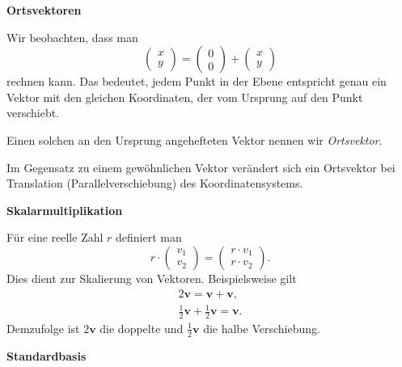 \documentclass[9pt]{beamer}
\newcommand{\bv}[1]{\mathbf{#1}}
\newcommand{\strong}[1]{\textsf{\textbf{#1}}}
\newcommand{\parspace}{\vspace{0.8em}}
\begin{document}
\begin{frame}
\begin{center}
\strong{Ortsvektoren}
\end{center}
\end{frame}

\begin{frame}
Wir beobachten, dass man
\[\begin{pmatrix}x\\ y\end{pmatrix}
= \begin{pmatrix}0\\ 0\end{pmatrix} + \begin{pmatrix}x\\ y\end{pmatrix}\]
rechnen kann. Das bedeutet, jedem Punkt in der Ebene entspricht genau
ein Vektor mit den gleichen Koordinaten, der vom Ursprung auf den Punkt
verschiebt.\pause

\parspace
Einen solchen an den Ursprung angehefteten Vektor nennen wir \emph{Ortsvektor}.\pause

\parspace
Im Gegensatz zu einem gewöhnlichen Vektor verändert sich ein Ortsvektor
bei Translation (Parallelverschiebung) des Koordinatensystems.
\end{frame}

\begin{frame}
\begin{center}
\strong{Skalarmultiplikation}
\end{center}
\end{frame}

\begin{frame}
Für eine reelle Zahl $r$ definiert man
\[r\cdot\begin{pmatrix}v_1\\ v_2\end{pmatrix}
= \begin{pmatrix}r\cdot v_1\\ r\cdot v_2\end{pmatrix}.\]\pause
Dies dient zur Skalierung von Vektoren. Beispielsweise gilt
\begin{gather*}
2\bv v = \bv v + \bv v,\\
\tfrac{1}{2}\bv v + \tfrac{1}{2}\bv v = \bv v.
\end{gather*}
Demzufolge ist $2\bv v$ die doppelte und $\tfrac{1}{2}\bv v$ die halbe
Verschiebung.
\end{frame}

\begin{frame}
\begin{center}
\strong{Standardbasis}
\end{center}
\end{frame}
\end{document}

